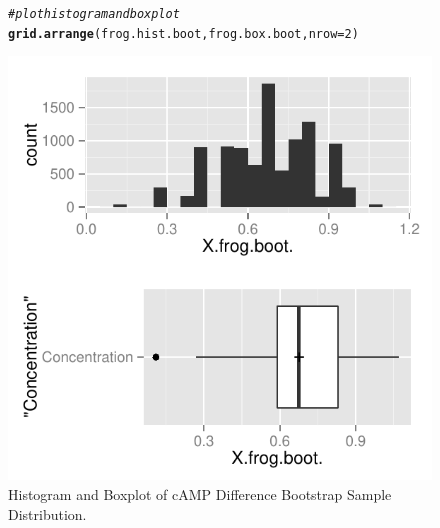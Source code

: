 \documentclass{article}\usepackage[]{graphicx}\usepackage[]{color}
\makeatletter
\def\maxwidth{ %
  \ifdim\Gin@nat@width>\linewidth
    \linewidth
  \else
    \Gin@nat@width
  \fi
}
\newcommand{\hlnum}[1]{\textcolor[rgb]{0.686,0.059,0.569}{#1}}%
\newcommand{\hlcom}[1]{\textcolor[rgb]{0.678,0.584,0.686}{\textit{#1}}}%
\newcommand{\hlstd}[1]{\textcolor[rgb]{0.345,0.345,0.345}{#1}}%
\newcommand{\hlkwc}[1]{\textcolor[rgb]{0.333,0.667,0.333}{#1}}%
\newcommand{\hlkwd}[1]{\textcolor[rgb]{0.737,0.353,0.396}{\textbf{#1}}}%
\newenvironment{kframe}{%
 \def\at@end@of@kframe{}%
 \ifinner\ifhmode%
  \def\at@end@of@kframe{\end{minipage}}%
  \begin{minipage}{\columnwidth}%
 \fi\fi%
 \def\FrameCommand##1{\hskip\@totalleftmargin \hskip-\fboxsep
 \colorbox{shadecolor}{##1}\hskip-\fboxsep
     \hskip-\linewidth \hskip-\@totalleftmargin \hskip\columnwidth}%
 \MakeFramed {\advance\hsize-\width
   \@totalleftmargin\z@ \linewidth\hsize
   \@setminipage}}%
 {\par\unskip\endMakeFramed%
 \at@end@of@kframe}
\newenvironment{knitrout}{}{} %
\makeatother
\begin{document}
\begin{figure}[H]  \begin{center}
\begin{knitrout}
\color{fgcolor}\begin{kframe}
\begin{alltt}
\hlcom{# plot histogram and boxplot}
\hlkwd{grid.arrange}\hlstd{(frog.hist.boot, frog.box.boot,} \hlkwc{nrow} \hlstd{=} \hlnum{2}\hlstd{)}
\end{alltt}
\end{kframe}
\includegraphics[width=\maxwidth]{figure/2_frog_bootbox_plot} 

\end{knitrout}
\end{center} \caption{Histogram and Boxplot of cAMP Difference Bootstrap Sample Distribution.} \end{figure}
\end{document}
